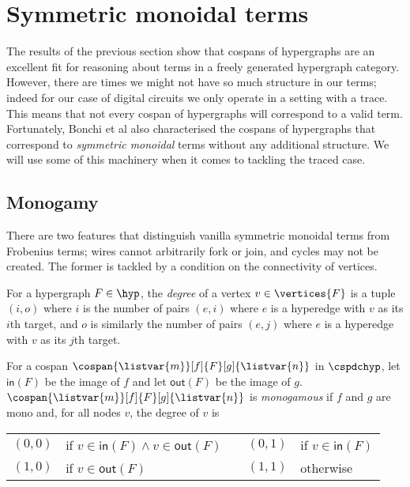 \section{Symmetric monoidal terms}

The results of the previous section show that cospans of hypergraphs are an
excellent fit for reasoning about terms in a freely generated hypergraph
category.
However, there are times we might not have so much structure in our terms;
indeed for our case of digital circuits we only operate in a setting with a
trace.
This means that not every cospan of hypergraphs will correspond to a valid term.
Fortunately, Bonchi et al also characterised the cospans of hypergraphs that
correspond to \emph{symmetric monoidal} terms without any additional structure.
We will use some of this machinery when it comes to tackling the traced case.

\subsection{Monogamy}

There are two features that distinguish vanilla symmetric monoidal terms from
Frobenius terms; wires cannot arbitrarily fork or join, and cycles may not be
created.
The former is tackled by a condition on the connectivity of vertices.

\begin{definition}
    For a hypergraph \(F \in \hyp\), the \emph{degree} of a vertex
    \(v \in \vertices{F}\) is a tuple \((i,o)\) where \(i\) is the number of
    pairs \((e,i)\) where \(e\) is a hyperedge with \(v\) as its \(i\)th target,
    and \(o\) is similarly the number of pairs \((e,j)\) where \(e\) is a
    hyperedge with \(v\) as its \(j\)th target.
\end{definition}

\begin{definition}
    For a cospan \(\cospan{\listvar{m}}[f]{F}[g]{\listvar{n}}\) in
    \(\cspdchyp\), let \(\mathsf{in}(F)\) be the image of \(f\) and let
    \(\mathsf{out}(F)\) be the image of \(g\).
    \(\cospan{\listvar{m}}[f]{F}[g]{\listvar{n}}\) is \emph{monogamous} if
    \(f\) and \(g\) are mono and, for all nodes \(v\), the degree of \(v\) is
    \begin{center}
        \begin{tabular}{rlcrl}
            \((0,0)\)
            &
            if \(v \in \mathsf{in}(F) \wedge v \in \mathsf{out}(F)\)
            &
            \quad
            &
            \((0,1)\)
            &
            if \(v \in \mathsf{in}(F)\)
            \\
            \((1,0)\)
            &
            if \(v \in \mathsf{out}(F)\)
            &
            \quad
            &
            \((1,1)\)
            &
            otherwise
        \end{tabular}
    \end{center}
\end{definition}

